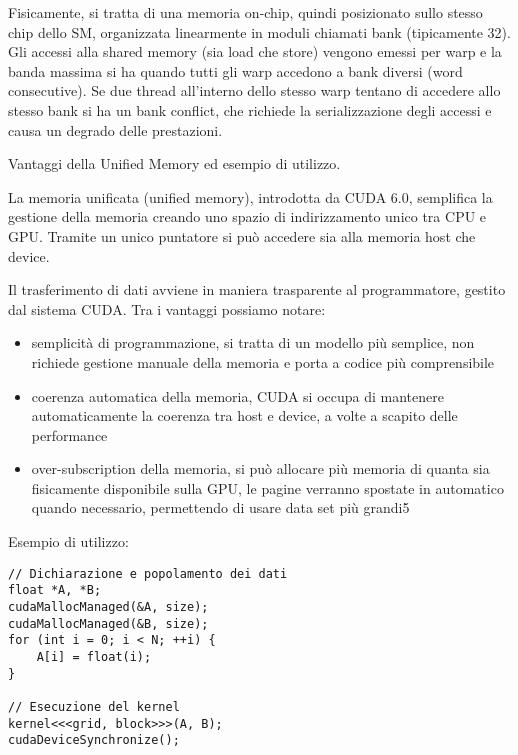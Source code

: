 \begin{questions}
\begin{solution}
        Fisicamente, si tratta di una memoria on-chip, quindi posizionato sullo stesso chip dello SM, organizzata linearmente in moduli chiamati bank (tipicamente 32). Gli accessi alla shared memory (sia load che store) vengono emessi per warp e la banda massima si ha quando tutti gli warp accedono a bank diversi (word consecutive). Se due thread all'interno dello stesso warp tentano di accedere allo stesso bank si ha un bank conflict, che richiede la serializzazione degli accessi e causa un degrado delle prestazioni.
    \end{solution}
    
    \question Vantaggi della Unified Memory ed esempio di utilizzo.
    
    \begin{solution}
        La memoria unificata (unified memory), introdotta da CUDA 6.0, semplifica la gestione della memoria creando uno spazio di indirizzamento unico tra CPU e GPU. Tramite un unico puntatore si può accedere sia alla memoria host che device. 
        
        Il trasferimento di dati avviene in maniera trasparente al programmatore, gestito dal sistema CUDA. Tra i vantaggi possiamo notare:
        \begin{itemize}
            \item semplicità di programmazione, si tratta di un modello più semplice, non richiede gestione manuale della memoria e porta a codice più comprensibile
            
            \item coerenza automatica della memoria, CUDA si occupa di mantenere automaticamente la coerenza tra host e device, a volte a scapito delle performance
            
            \item over-subscription della memoria, si può allocare più memoria di quanta sia fisicamente disponibile sulla GPU, le pagine verranno spostate in automatico quando necessario, permettendo di usare data set più grandi5
        \end{itemize} 
        
        Esempio di utilizzo:
        \begin{verbatim}
// Dichiarazione e popolamento dei dati
float *A, *B;
cudaMallocManaged(&A, size);
cudaMallocManaged(&B, size);
for (int i = 0; i < N; ++i) {
    A[i] = float(i);
}

// Esecuzione del kernel
kernel<<<grid, block>>>(A, B);
cudaDeviceSynchronize();


\end{verbatim}
\end{solution}
\end{questions}
